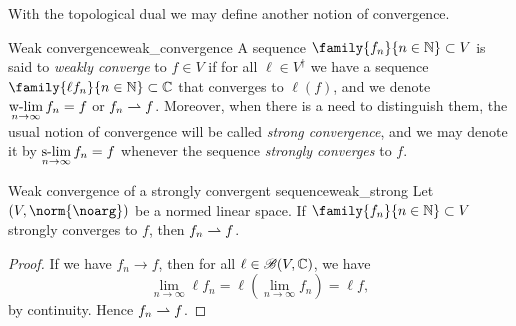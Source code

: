 With the topological dual we may define another notion of convergence.
\begin{definition}{Weak convergence}{weak_convergence}
    A sequence \(\family{f_n}{n\in \mathbb{N}} \subset V\) is said to \emph{weakly converge} to \(f \in V\) if for all \(\ell \in V^\dagger\) we have a sequence \(\family{\ell f_n}{n\in \mathbb{N}} \subset \mathbb{C}\) that converges to \(\ell(f)\), and we denote \(\displaystyle\operatorname*{w-lim}_{n\to\infty} f_n = f\) or \(f_n \rightharpoonup f\). Moreover, when there is a need to distinguish them, the usual notion of convergence will be called \emph{strong convergence}, and we may denote it by \(\displaystyle\operatorname*{s-lim}_{n\to\infty}f_n = f\) whenever the sequence \emph{strongly converges} to \(f\).
\end{definition}

\begin{proposition}{Weak convergence of a strongly convergent sequence}{weak_strong}
    Let \((V, \norm{\noarg})\) be a normed linear space. If \(\family{f_n}{n \in \mathbb{N}}\subset V\) strongly converges to \(f\), then \(f_n \rightharpoonup f\).
\end{proposition}
\begin{proof}
    If we have \(f_n \to f\), then for all \(\ell \in \mathscr{B}(V, \mathbb{C})\), we have
    \begin{equation*}
        \lim_{n\to \infty} \ell f_n = \ell\left(\lim_{n\to \infty} f_n\right) = \ell f,
    \end{equation*}
    by continuity. Hence \(f_n \rightharpoonup f\).
\end{proof}
